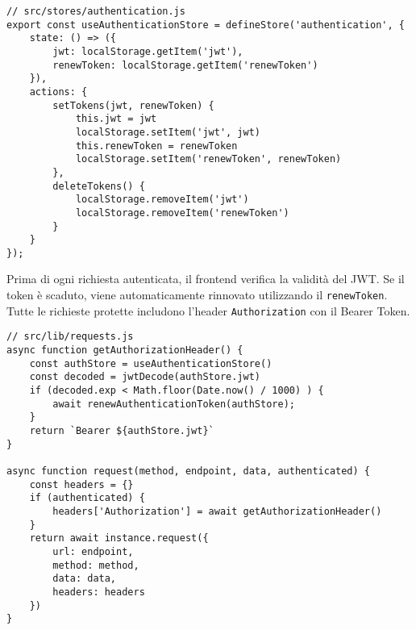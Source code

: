 \begin{lstlisting}
// src/stores/authentication.js
export const useAuthenticationStore = defineStore('authentication', {
    state: () => ({
        jwt: localStorage.getItem('jwt'),
        renewToken: localStorage.getItem('renewToken')
    }),
    actions: {
        setTokens(jwt, renewToken) {
            this.jwt = jwt
            localStorage.setItem('jwt', jwt)
            this.renewToken = renewToken
            localStorage.setItem('renewToken', renewToken)
        },
        deleteTokens() {
            localStorage.removeItem('jwt')
            localStorage.removeItem('renewToken')
        }
    }
});
\end{lstlisting}

Prima di ogni richiesta autenticata, il frontend verifica la validità del JWT. Se il token è scaduto, viene automaticamente rinnovato utilizzando il \texttt{renewToken}. Tutte le richieste protette includono l'header \texttt{Authorization} con il Bearer Token.

\begin{lstlisting}
// src/lib/requests.js
async function getAuthorizationHeader() {
    const authStore = useAuthenticationStore()
    const decoded = jwtDecode(authStore.jwt)
    if (decoded.exp < Math.floor(Date.now() / 1000) ) {
        await renewAuthenticationToken(authStore);
    }
    return `Bearer ${authStore.jwt}`
}

async function request(method, endpoint, data, authenticated) {
    const headers = {}
    if (authenticated) {
        headers['Authorization'] = await getAuthorizationHeader()
    }
    return await instance.request({
        url: endpoint,
        method: method,
        data: data,
        headers: headers
    })
}
\end{lstlisting}